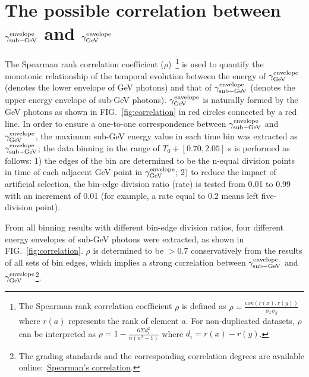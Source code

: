 \documentclass[prd,twocolumn,amsmath,amssymb,aps,linenumbers]{revtex4-2} %
\begin{document}
\section{The possible correlation between $\gamma^{\rm envelope}_{\rm sub-GeV}$ and $\gamma^{\rm envelope}_{\rm GeV}$}\label{sec: correlation}

The Spearman rank correlation coefficient ($\rho$)~\citep{spearman}\footnote{The Spearman rank correlation coefficient $\rho$ is defined as $\rho = \frac{\mathrm{cov}(r(x),r(y))}{\sigma_x \sigma_y} $ where $r(a)$ represents the rank of element $a$. For non-duplicated datasets, $\rho$ can be interpreted as $\rho = 1 - \frac{6 \Sigma d^2_i}{n(n^2-1)} $ where $d_i = r(x) - r(y)$.} is used to quantify the monotonic relationship of the temporal evolution between the energy of $\gamma^{\rm envelope}_{\rm GeV}$ (denotes the lower envelope of GeV photons) and that of $\gamma^{\rm envelope}_{\rm sub-GeV}$ (denotes the upper energy envelope of sub-GeV photons). $\gamma^{\rm envelope}_{\rm GeV}$ is naturally formed by the GeV photons as shown in FIG.~\ref{fig:correlation} in red circles connected by a red line.
In order to ensure a one-to-one correspondence between $\gamma^{\rm envelope}_{\rm sub-GeV}$ and $\gamma^{\rm envelope}_{\rm GeV}$, the maximum sub-GeV energy value in each time bin was extracted as $\gamma^{\rm envelope}_{\rm sub-GeV}$; the data binning in the range of $T_0+[0.70, 2.05]$ s is performed as follows: 1) the edges of the bin are determined to be the n-equal division points in time of each adjacent GeV point in $\gamma^{\rm envelope}_{\rm GeV}$; 2) to reduce the impact of artificial selection, the bin-edge division ratio (rate) is tested from 0.01 to 0.99 with an increment of 0.01 (for example, a rate equal to 0.2 means left five-division point). 

From all binning results with different bin-edge division ratios, four different energy envelopes of sub-GeV photons were extracted, as shown in FIG.~\ref{fig:correlation}. $\rho$ is determined to be $> 0.7$ conservatively from the results of all sets of bin edges, which implies a strong correlation between $\gamma^{\rm envelope}_{\rm sub-GeV}$ and $\gamma^{\rm envelope}_{\rm GeV}$\footnote{The grading standards and the corresponding correlation degrees are available online:~\href{https://www.statstutor.ac.uk/resources/uploaded/spearmans.pdf}{Spearman's correlation}. }.
\end{document}
